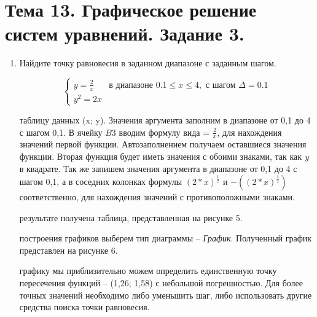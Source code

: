 \section{Тема 13. Графическое решение систем уравнений. Задание 3.}
\label{sec:task13}

\begin{enumerate}
	\item\large
	Найдите точку равновесия в заданном диапазоне с заданным шагом.

		\[
			\begin{cases}
			    y = \frac{2}{x} & \text{в диапазоне } 0.1 \leq x \leq 4, \text{ с шагом } \Delta = 0.1 \\
			    y^2 = 2x
			\end{cases}
		\]
	\begin{item}
		 таблицу данных (x; y). Значения аргумента заполним в диапазоне от 0,1 до 4 с шагом 0,1. В ячейку $B3$ вводим формулу вида = $\frac{2}{x}$, для нахождения значений первой функции. Автозаполнением получаем оставшиеся значения функции. Вторая функция будет иметь значения с обоими знаками, так как \textit{y} в квадрате. Так же запишем значения аргумента в диапазоне от 0,1 до 4 с шагом 0,1, а в соседних колонках формулы $(2 * x) ^ \frac{1}{2}$ и $-((2 * x) ^ \frac{1}{2})$ соответственно, для нахождения значений с противоположными знаками.

		 результате получена таблица, представленная на рисунке 5.

        \newpage

		 построения графиков выберем тип диаграммы -- \textit{График}. Полученный график представлен на рисунке 6.


		 графику мы приблизительно можем определить единственную точку пересечения функций -- (1,26; 1,58) с небольшой погрешностью. Для более точных значений необходимо либо уменьшить шаг, либо использовать другие средства поиска точки равновесия.
	\end{item}
\end{enumerate}